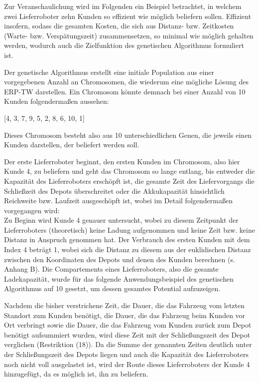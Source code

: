 \documentclass[a4paper,12pt,parskip,bibtotoc,liststotoc]{article}
\begin{document}
Zur Veranschaulichung wird im Folgenden ein Beispiel betrachtet, in welchem zwei Lieferroboter zehn Kunden so effizient wie möglich beliefern sollen.
Effizient insofern, sodass die gesamten Kosten, die sich aus Distanz- bzw. Zeitkosten (Warte- bzw. Verspätungszeit) zusammensetzen, so minimal wie möglich gehalten werden, wodurch auch die Zielfunktion des genetischen Algorithmus formuliert ist. 

Der genetische Algorithmus erstellt eine initiale Population aus einer vorgegebenen Anzahl an Chromosomen, die wiederum eine mögliche Lösung des ERP-TW darstellen. 
Ein Chromosom könnte demnach bei einer Anzahl von 10 Kunden folgendermaßen aussehen:

\begin{center}
[4, 3, 7, 9, 5, 2, 8, 6, 10, 1]

\end{center}

Dieses Chromosom besteht also aus 10 unterschiedlichen Genen, die jeweils einen Kunden darstellen, der beliefert werden soll.
 
Der erste Lieferroboter beginnt, den ersten Kunden im Chromosom, also hier Kunde 4, zu beliefern und geht das Chromosom so lange entlang, bis entweder die Kapazität des Lieferroboters erschöpft ist, die gesamte Zeit des Liefervorgangs die Schließzeit des Depots überschreitet oder die Akkukapazität hinsichtlich Reichweite bzw. Laufzeit ausgeschöpft ist, wobei im Detail folgendermaßen vorgegangen wird:\\
 
Zu Beginn wird Kunde 4 genauer untersucht, wobei zu diesem Zeitpunkt der Lieferroboters (theoretisch) keine Ladung aufgenommen und keine Zeit bzw. keine Distanz in Anspruch genommen hat.
Der Verbrauch des ersten Kunden mit dem Index 4 beträgt 1, wobei sich die Distanz zu diesem aus der euklidischen Distanz zwischen den Koordinaten des Depots und denen des Kunden berechnen (s. Anhang B).
Die Compartements eines Lieferroboters, also die gesamte Ladekapazität, wurde für das folgende Anwendungsbeispiel des genetischen Algorithmus auf 10 gesetzt, um dessen gesamtes Potential aufzuzeigen.

Nachdem die bisher verstrichene Zeit, die Dauer, die das Fahrzeug vom letzten Standort zum Kunden benötigt, die Dauer, die das Fahrzeug beim Kunden vor Ort verbringt sowie die Dauer, die das Fahrzeug vom Kunden zurück zum Depot benötigt aufsummiert wurden, wird diese Zeit mit der Schließungszeit des Depot verglichen (Restriktion (18)). 
Da die Summe der genannten Zeiten deutlich unter der Schließungszeit des Depots liegen und auch die Kapazität des Lieferroboters noch nicht voll ausgelastet ist, wird der Route dieses Lieferroboters der Kunde 4 hinzugefügt, da es möglich ist, ihn zu beliefern.
\end{document}
